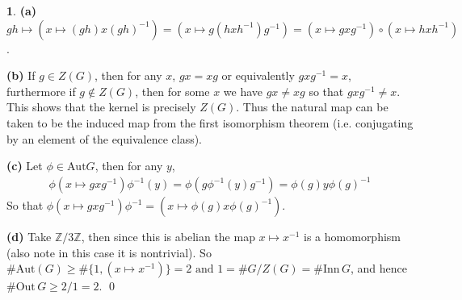 \documentclass[10.5pt]{article}
\theoremstyle{definition}
\newtheorem{pb}{}
\newcommand{\set}[1]{\{#1\}}
\newcommand{\tand}{\text{ and }}
\begin{document}
    \begin{pb}
        \textbf{(a)} \(gh \mapsto (x \mapsto (gh)x(gh)^{-1}) = (x \mapsto g(hxh^{-1})g^{-1}) = (x \mapsto gxg^{-1})\circ(x \mapsto hxh^{-1})\).

        \textbf{(b)} If \(g \in Z(G)\), then for any \(x\), \(gx = xg\) or equivalently \(gxg^{-1} = x\), furthermore if \(g \not \in Z(G)\), then for some \(x\) we have \(gx \neq xg\) so that \(gxg^{-1} \neq x\). This shows that the kernel is precisely \(Z(G)\). Thus the natural map can be taken to be the induced map from the first isomorphism theorem (i.e. conjugating by an element of the equivalence class).

        \textbf{(c)} Let \(\phi \in \text{Aut} G\), then for any \(y\),
        \begin{align*}
            \phi(x \mapsto gxg^{-1})\phi^{-1}(y) = \phi(g\phi^{-1}(y)g^{-1}) = \phi(g)y\phi(g)^{-1}
        \end{align*}
        So that \(\phi(x \mapsto gxg^{-1})\phi^{-1} = (x \mapsto \phi(g)x\phi(g)^{-1})\).

        \textbf{(d)} Take \(\mathbb{Z}/3 \mathbb{Z}\), then since this is abelian the map \(x \mapsto x^{-1}\) is a homomorphism (also note in this case it is nontrivial). So \(\# \text{Aut}(G) \geq \# \set{1, (x \mapsto x^{-1})} = 2 \tand 1 =  \# G/Z(G) = \# \text{Inn}\,G\), and hence \(\# \text{Out}\,G \geq 2/1 = 2\). \qed
    \end{pb}
\end{document}
